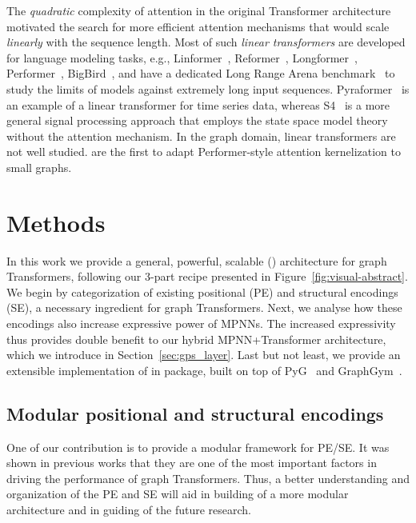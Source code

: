 \documentclass{article}
\begin{document}
The \emph{quadratic} complexity of attention in the original Transformer architecture~\cite{vaswani2017attention} motivated the search for more efficient attention mechanisms that would scale \emph{linearly} with the sequence length. 
Most of such \emph{linear transformers} are developed for language modeling tasks, e.g., Linformer~\cite{Wang2020LinformerSW}, Reformer~\cite{DBLP:conf/iclr/KitaevKL20}, Longformer~\cite{DBLP:journals/corr/abs-2004-05150}, Performer~\cite{DBLP:conf/iclr/ChoromanskiLDSG21}, BigBird~\cite{DBLP:conf/nips/ZaheerGDAAOPRWY20}, and have a dedicated Long Range Arena benchmark~\cite{tay2021long} to study the limits of models against extremely long input sequences.
Pyraformer~\cite{liu2022pyraformer} is an example of a linear transformer for time series data, whereas S4~\cite{gu2022efficiently} is a more general signal processing approach that employs the state space model theory without the attention mechanism. 
In the graph domain, linear transformers are not well studied. \citet{choromanski2021blocktoeplitz} are the first to adapt Performer-style attention kernelization to small graphs.


\vspace{-3pt}
\section{Methods}
\vspace{-3pt}
In this work we provide a general, powerful, scalable (\method) architecture for graph Transformers, following our 3-part recipe presented in Figure~\ref{fig:visual-abstract}. We begin by categorization of existing positional (PE) and structural encodings (SE), a necessary ingredient for graph Transformers. Next, we analyse how these encodings also increase expressive power of MPNNs. The increased expressivity thus provides double benefit to our hybrid MPNN+Transformer architecture, which we introduce in Section~\ref{sec:gps_layer}. Last but not least, we provide an extensible implementation of \method in \gtgym package, built on top of PyG~\cite{FeyLenssen2019PyG} and GraphGym~\cite{you2020design}.



\vspace{-3pt}
\subsection{Modular positional and structural encodings}
\vspace{-3pt}
\label{sec:pe_se}
One of our contribution is to provide a modular framework for PE/SE. It was shown in previous works that they are one of the most important factors in driving the performance of graph Transformers. Thus, a better understanding and organization of the PE and SE will aid in building of a more modular architecture and in guiding of the future research.
\end{document}
